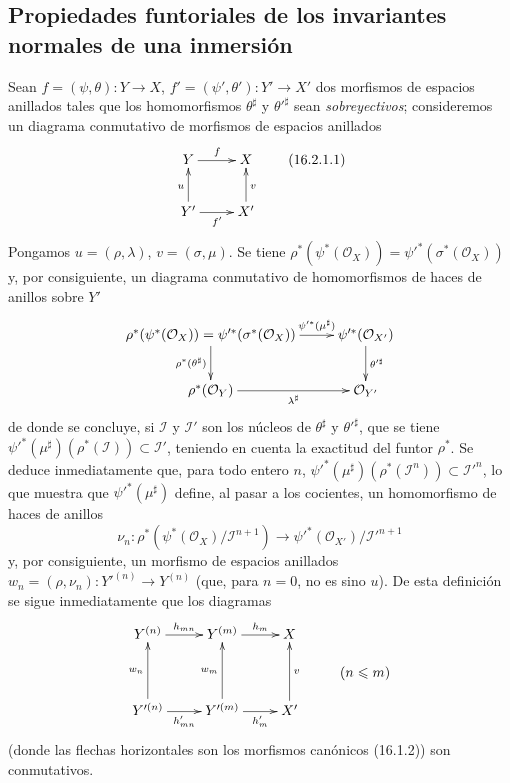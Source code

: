 \subsection{Propiedades funtoriales de los invariantes normales de una inmersión}
\label{IV.16.2}

\begin{env}[16.2.1]
\label{IV.16.2.1}
Sean $f=(\psi,\theta):Y\to X$,
$f'=(\psi',\theta'):Y'\to X'$ dos morfismos de espacios anillados tales que los
homomorfismos $\theta^\sharp$ y $\theta'^\sharp$ sean \emph{sobreyectivos}; consideremos un
diagrama conmutativo de morfismos de espacios anillados
\[
  \xymatrix{
    Y \ar[r]^f & X \\
    Y' \ar[r]_{f'} \ar[u]^u & X' \ar[u]_v
  }
  \tag{16.2.1.1}
  \label{IV.16.2.1.1}
\]
Pongamos $u=(\rho,\lambda)$, $v=(\sigma,\mu)$. Se tiene
$\rho^*(\psi^*(\mathcal{O}_X))=
\psi'^*(\sigma^*(\mathcal{O}_X))$ y, por consiguiente, un diagrama conmutativo
de homomorfismos de haces de anillos sobre $Y'$
\[
  \xymatrix{
    \rho^*(\psi^*(\mathcal{O}_X))
      =\psi'^*(\sigma^*(\mathcal{O}_X))
      \ar[r]^-{\psi'^*(\mu^\sharp)}
      \ar[d]_{\rho^*(\theta^\sharp)}
      & \psi'^*(\mathcal{O}_{X'}) \ar[d]^{\theta'^\sharp} \\
    \rho^*(\mathcal{O}_Y) \ar[r]_-{\lambda^\sharp}
      & \mathcal{O}_{Y'}
  }
\]
de donde se concluye, si $\mathscr{I}$ y $\mathscr{I}'$ son los núcleos de
$\theta^\sharp$ y $\theta'^\sharp$, que se tiene
$\psi'^*(\mu^\sharp)(\rho^*(\mathscr{I}))\subset\mathscr{I}'$, teniendo en cuenta la
exactitud del funtor $\rho^*$. Se deduce inmediatamente que, para todo entero
$n$,
$\psi'^*(\mu^\sharp)(\rho^*(\mathscr{I}^n))\subset\mathscr{I}'^n$, lo que muestra
que $\psi'^*(\mu^\sharp)$ define, al pasar a los cocientes, un homomorfismo de
haces de anillos
\[
  \nu_n:
  \rho^*(\psi^*(\mathcal{O}_X)/\mathscr{I}^{n+1})
  \longrightarrow
  \psi'^*(\mathcal{O}_{X'})/\mathscr{I}'^{n+1}
  \tag{16.2.1.2}
  \label{IV.16.2.1.2}
\]
y, por consiguiente, un morfismo de espacios anillados
$w_n=(\rho,\nu_n):Y'^{(n)}\to Y^{(n)}$ (que, para $n=0$, no es sino
$u$). De esta definición se sigue inmediatamente que los diagramas
\[
  \xymatrix@R=1pc{
    Y^{(n)} \ar[r]^-{h_{mn}} & Y^{(m)} \ar[r]^-{h_m} & X \\
    & & & (n\leq m) \\
    Y'^{(n)} \ar[r]_-{h'_{mn}} \ar[uu]^-{w_n}
      & Y'^{(m)} \ar[r]_-{h'_m} \ar[uu]^-{w_m}
      & X' \ar[uu]_-v
  }
\]
(donde las flechas horizontales son los morfismos canónicos (16.1.2)) son
conmutativos.


\end{env}
